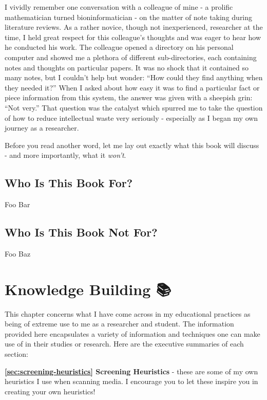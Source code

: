 \documentclass[
  notoc %
]{tufte-book}
\begin{document}
I vividly remember one conversation with a colleague of mine - a
prolific mathematician turned bioninformatician - on the matter of note
taking during literature reviews. As a rather novice, though not
inexperienced, researcher at the time, I held great respect for this
colleague's thoughts and was eager to hear how he conducted his work.
The colleague opened a directory on his personal computer and showed me
a plethora of different sub-directories, each containing notes and
thoughts on particular papers. It was no shock that it contained so many
notes, but I couldn't help but wonder: ``How could they find anything
when they needed it?'' When I asked about how easy it was to find a
particular fact or piece information from this system, the answer was
given with a sheepish grin: ``Not very.'' That question was the catalyst
which spurred me to take the question of how to reduce intellectual
waste very seriously - especially as I began my own journey as a
researcher.

Before you read another word, let me lay out exactly what this book will
discuss - and more importantly, what it \emph{won't}.

\hypertarget{who-is-this-book-for}{%
\section{Who Is This Book For?}\label{who-is-this-book-for}}

Foo Bar

\hypertarget{who-is-this-book-not-for}{%
\section{Who Is This Book Not For?}\label{who-is-this-book-not-for}}

Foo Baz

\hypertarget{knowledge-building}{%
\chapter{Knowledge Building 📚}\label{knowledge-building}}

This chapter concerns what I have come across in my educational
practices as being of extreme use to me as a researcher and student. The
information provided here encapsulates a variety of information and
techniques one can make use of in their studies or research. Here are
the executive summaries of each section:

\textbf{\ref{sec:screening-heuristics} Screening Heuristics} - these are
some of my own heuristics I use when scanning media. I encourage you to
let these inspire you in creating your own heuristics!
\end{document}
